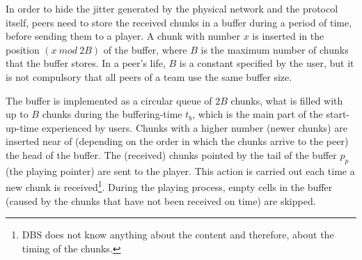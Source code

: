 

\label{sec:buffering_chunks}

In order to hide the jitter generated by the physical network and the
protocol itself, peers need to store the received chunks in a buffer
during a period of time, before sending them to a player. A chunk with
number $x$ is inserted in the position $(x~\mathit{mod}~2B)$ of the
buffer, where $B$ is the maximum number of chunks that the buffer
stores. In a peer's life, $B$ is a constant specified by the user,
but it is not compulsory that all peers of a team use the same buffer
size.

The buffer is implemented as a circular queue of $2B$ chunks, what is
filled with up to $B$ chunks during the \gls{buffering-time} $t_b$,
which is the main part of the \gls{start-up-time} experienced by
users. Chunks with a higher number (newer chunks) are inserted near of
(depending on the order in which the chunks arrive to the peer) the
head of the buffer. The (received) chunks pointed by the tail of the
buffer $p_p$ (the playing pointer) are sent to the player. This action
is carried out each time a new chunk is received\footnote{DBS does not
  know anything about the content and therefore, about the timing of
  the chunks.}. During the playing process, empty cells in the buffer
(caused by the chunks that have not been received on time) are skipped.

